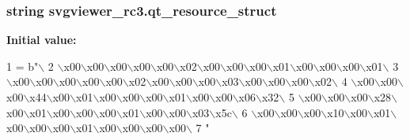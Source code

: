 \subsubsection[{qt\+\_\+resource\+\_\+struct}]{\setlength{\rightskip}{0pt plus 5cm}string svgviewer\+\_\+rc3.\+qt\+\_\+resource\+\_\+struct}\label{namespacesvgviewer__rc3_a929bc57dcf6e9428fea3fe0a2c2f80fd}
{\bfseries Initial value\+:}
\begin{DoxyCode}
1 = b\textcolor{stringliteral}{"\(\backslash\)}
2 \textcolor{stringliteral}{\(\backslash\)x00\(\backslash\)x00\(\backslash\)x00\(\backslash\)x00\(\backslash\)x00\(\backslash\)x02\(\backslash\)x00\(\backslash\)x00\(\backslash\)x00\(\backslash\)x01\(\backslash\)x00\(\backslash\)x00\(\backslash\)x00\(\backslash\)x01\(\backslash\)}
3 \textcolor{stringliteral}{\(\backslash\)x00\(\backslash\)x00\(\backslash\)x00\(\backslash\)x00\(\backslash\)x00\(\backslash\)x02\(\backslash\)x00\(\backslash\)x00\(\backslash\)x00\(\backslash\)x03\(\backslash\)x00\(\backslash\)x00\(\backslash\)x00\(\backslash\)x02\(\backslash\)}
4 \textcolor{stringliteral}{\(\backslash\)x00\(\backslash\)x00\(\backslash\)x00\(\backslash\)x44\(\backslash\)x00\(\backslash\)x01\(\backslash\)x00\(\backslash\)x00\(\backslash\)x00\(\backslash\)x01\(\backslash\)x00\(\backslash\)x00\(\backslash\)x06\(\backslash\)x32\(\backslash\)}
5 \textcolor{stringliteral}{\(\backslash\)x00\(\backslash\)x00\(\backslash\)x00\(\backslash\)x28\(\backslash\)x00\(\backslash\)x01\(\backslash\)x00\(\backslash\)x00\(\backslash\)x00\(\backslash\)x01\(\backslash\)x00\(\backslash\)x00\(\backslash\)x03\(\backslash\)x5c\(\backslash\)}
6 \textcolor{stringliteral}{\(\backslash\)x00\(\backslash\)x00\(\backslash\)x00\(\backslash\)x10\(\backslash\)x00\(\backslash\)x01\(\backslash\)x00\(\backslash\)x00\(\backslash\)x00\(\backslash\)x01\(\backslash\)x00\(\backslash\)x00\(\backslash\)x00\(\backslash\)x00\(\backslash\)}
7 \textcolor{stringliteral}{"}
\end{DoxyCode}
